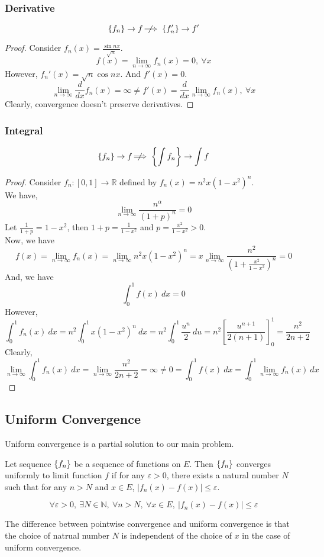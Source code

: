 \subsubsection{Derivative}
\[ \left\{f_n\right\} \to f \;\not\nobreak\!\!\!\!\implies \left\{f_n'\right\} \to f' \]
\begin{proof}
	Consider $f_n(x) = \frac{\sin nx}{\sqrt{n}}$.
	\[ f(x) = \lim_{n \to \infty} f_n(x) = 0,\ \forall x \]
	However, $f_n'(x) = \sqrt{n} \cos nx$.
	And $f'(x) = 0$.
	\[ \lim_{n \to \infty} \frac{d}{dx} f_n(x) = \infty \ne f'(x) = \frac{d}{dx} \lim_{n \to \infty} f_n(x),\ \forall x \]
	Clearly, convergence doesn't preserve derivatives.
\end{proof}
\subsubsection{Integral}
\[ \left\{f_n\right\} \to f \;\not\nobreak\!\!\!\!\implies \left\{ \int f_n\right\} \to \int f \]
\begin{proof}
	Consider $f_n : [0,1] \to \mathbb{R}$ defined by $f_n(x) = n^2 x (1-x^2)^n$.\\

	We have,
	\[ \lim_{n \to \infty} \frac{n^\alpha}{(1+p)^n} = 0 \]
	Let $\frac{1}{1+p} = 1-x^2$, then $1+p = \frac{1}{1-x^2}$ and $p = \frac{x^2}{1-x^2} > 0$.\\
	Now, we have
	\[ f(x) = \lim_{n \to \infty} f_n(x) = \lim_{n \to \infty} n^2 x(1-x^2)^n = x \lim_{n \to \infty} \frac{n^2}{\left(1+\frac{x^2}{1-x^2}\right)^n} = 0 \]
	And, we have
	\[ \int_0^1 f(x)\ dx = 0 \]
	However,
	\[ \int_0^1 f_n(x)\ dx = n^2 \int_0^1 x(1-x^2)^n\ dx = n^2 \int_0^1 \frac{u^n}{2}\ du = n^2 \left[ \frac{u^{n+1}}{2(n+1)} \right]_0^1 = \frac{n^2}{2n+2} \]
	Clearly, 
	\[ \lim_{n \to \infty} \int_0^1 f_n(x)\ dx = \lim_{n \to \infty} \frac{n^2}{2n+2} = \infty \ne 0 = \int_0^1 f(x)\ dx = \int_0^1 \lim_{n \to \infty} f_n(x)\ dx \]
\end{proof}
\subsection{Uniform Convergence}
Uniform convergence is a partial solution to our main problem.
\begin{definition}
	Let sequence $\left\{f_n\right\}$ be a sequence of functions on $E$.
	Then $\left\{f_n\right\}$ converges uniformly to limit function $f$ if for any $\varepsilon > 0$, there exists a natural number $N$ such that for any $n > N$ and $x \in E$, $|f_n(x) - f(x)| \le \varepsilon$.
\end{definition}
\begin{important}
	\[ \forall \varepsilon > 0,\ \exists N \in \mathbb{N},\ \forall n > N,\ \forall x \in E,\ |f_n(x) - f(x)| \le \varepsilon \]
\end{important}
\begin{commentary}
	The difference between pointwise convergence and uniform convergence is that the choice of natrual number $N$ is independent of the choice of $x$ in the case of uniform convergence.
\end{commentary}

